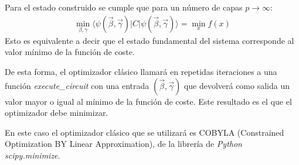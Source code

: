 \documentclass{article}
\begin{document}
Para el estado construido se cumple que para un número de capas \(p \rightarrow \infty\):
\begin{align*}
  \min_{\beta, \gamma} \langle \psi(\vec{\beta}, \vec{\gamma}) \rvert C \lvert \psi(\vec{\beta}, \vec{\gamma}) \rangle = \min_{x} f(x)
\end{align*}
Esto es equivalente a decir que el estado fundamental del sistema corresponde al valor mínimo de la función de coste.  %

De esta forma, el optimizador clásico llamará en repetidas iteraciones a una función \textit{execute\_circuit} con una entrada \((\vec{\beta}, \vec{\gamma})\) que devolverá como salida un valor mayor o igual al mínimo de la función de coste. Este resultado es el que el optimizador debe minimizar.

En este caso el optimizador clásico que se utilizará es COBYLA (Constrained Optimization BY Linear Approximation), de la librería de \textit{Python} \textit{scipy.minimize}.  %
\end{document}
